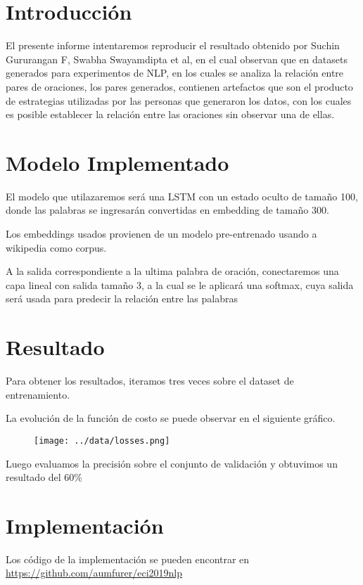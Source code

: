 \section{Introducci\'on}\label{sec:introducc'on}
El presente informe intentaremos reproducir el resultado obtenido por Suchin Gururangan F, Swabha Swayamdipta et al,
en el cual observan que en datasets generados para experimentos de NLP, en los cuales se analiza la relación entre
pares de oraciones, los pares generados, contienen artefactos que son el producto de estrategias utilizadas por
las personas que generaron los datos, con los cuales es posible establecer la relación entre las oraciones sin
observar una de ellas.

\section{Modelo Implementado}\label{sec:modelo-implementado}
El modelo que utilazaremos será una LSTM con un estado oculto de tamaño 100, donde las palabras se
ingresarán convertidas en embedding de tamaño 300.

Los embeddings usados provienen de un modelo  pre-entrenado  usando a wikipedia como corpus.

A la salida correspondiente a la ultima palabra de oración, conectaremos una capa lineal con
salida tamaño 3, a la cual se le aplicará una softmax, cuya salida será usada para predecir la
relación entre las palabras


\section{Resultado}\label{sec:resultado}

Para obtener los resultados, iteramos tres veces sobre el dataset de entrenamiento.

La evolución de la función de costo se puede observar en el siguiente gráfico.

\begin{figure}[hbtp]
  \centering
  \texttt{[image: ../data/losses.png]}
\end{figure}


Luego evaluamos la precisión sobre el conjunto de validación y obtuvimos un resultado del 60\%


\section{Implementación}
Los código de la implementación se pueden encontrar en \url{https://github.com/aumfurer/eci2019nlp}